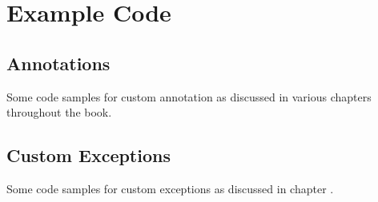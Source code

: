 \part{Example Code}\label{sec:ExampleCode}


\chapter{Annotations}
Some code samples for custom annotation as discussed in various chapters throughout the book.






\chapter{Custom Exceptions}
Some code samples for custom exceptions as discussed in chapter .











